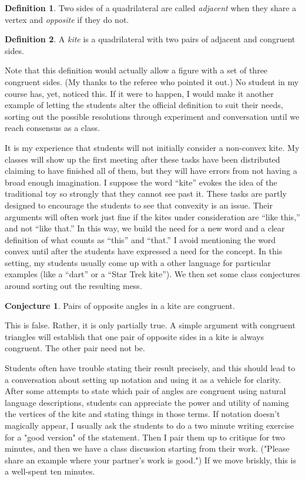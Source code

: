 \documentclass{tufte-handout}
\theoremstyle{definition}
\newtheorem{conjecture}[problem]{Conjecture}
\newtheorem*{definition}{Definition}
\begin{document}
\begin{definition}\label{defn:quad-sides-type}
Two sides of a quadrilateral are called \emph{adjacent} when they share a vertex and \emph{opposite} if they do not.
\end{definition}

\begin{definition}\label{defn:kite}
A \emph{kite} is a quadrilateral with two pairs of adjacent and congruent sides.
\end{definition}

Note that this definition would actually allow a figure with a set of three congruent sides. (My thanks to the referee who pointed it out.) No student in my course has, yet, noticed this. If it were to happen, I would make it another example of letting the students alter the official definition to suit their needs, sorting out the possible resolutions through experiment and conversation until we reach consensus as a class.

It is my experience that students will not initially consider a non-convex kite. My classes will show up the first meeting after these tasks have been distributed claiming to have finished all of them, but they will have errors from not having a broad enough imagination. I suppose the word ``kite'' 
evokes the idea of the traditional toy so strongly that they cannot see past it.
These tasks are partly designed to encourage the students to see that convexity is an issue.
Their arguments will often work just fine if the kites under consideration are ``like this,'' and not ``like that.'' In this way, we build the need for a new word and a clear definition of what counts as ``this'' and ``that.''
I avoid mentioning the word convex until after the students have expressed a need for the concept. In this setting, my students usually come up with a other language for particular examples (like a ``dart'' or a ``Star Trek kite''). We then set some class conjectures around sorting out the resulting mess.

\begin{conjecture}
\label{conj:kite-opp-angles}
Pairs of opposite angles in a kite are congruent.
\end{conjecture}

This is false. Rather, it is only partially true. A simple argument with congruent triangles will establish that one pair of opposite sides in a kite is always congruent. The other pair need not be. 

Students often have trouble stating their result precisely, and this should lead to a conversation about setting up notation and using it as a vehicle for clarity. After some attempts to state which pair of angles are congruent using natural language descriptions, students can appreciate the power and utility of naming the vertices of the kite and stating things in those terms. If notation doesn't magically appear, I usually ask the students to do a two minute writing exercise for a "good version" of the statement. Then I pair them up to critique for two minutes, and then we have a class discussion starting from their work. ("Please share an example where your partner's work is good.") If we move briskly, this is a well-spent ten minutes.
\end{document}
